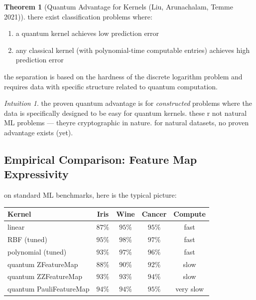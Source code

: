 \documentclass[11pt,a4paper]{article}
\theoremstyle{definition}
\newtheorem{theorem}{Theorem}[section]
\theoremstyle{remark}
\newtheorem*{intuition}{Intuition}
\begin{document}
\begin{theorem}[Quantum Advantage for Kernels (Liu, Arunachalam, Temme 2021)]
there exist classification problems where:
\begin{enumerate}[leftmargin=*]
    \item a quantum kernel achieves low prediction error
    \item any classical kernel (with polynomial-time computable entries) achieves high prediction error
\end{enumerate}
the separation is based on the hardness of the discrete logarithm problem and requires data with specific structure related to quantum computation.
\end{theorem}

\begin{intuition}
the proven quantum advantage is for \emph{constructed} problems where the data is specifically designed to be easy for quantum kernels. these r not natural ML problems --- theyre cryptographic in nature. for natural datasets, no proven advantage exists (yet).
\end{intuition}

\subsection{Empirical Comparison: Feature Map Expressivity}

on standard ML benchmarks, here is the typical picture:

\begin{center}
\renewcommand{\arraystretch}{1.4}
\begin{tabular}{|l|c|c|c|c|}
\hline
\textbf{Kernel} & \textbf{Iris} & \textbf{Wine} & \textbf{Cancer} & \textbf{Compute} \\
\hline
linear & $87\%$ & $95\%$ & $95\%$ & fast \\
\hline
RBF (tuned) & $95\%$ & $98\%$ & $97\%$ & fast \\
\hline
polynomial (tuned) & $93\%$ & $97\%$ & $96\%$ & fast \\
\hline
quantum ZFeatureMap & $88\%$ & $90\%$ & $92\%$ & slow \\
\hline
quantum ZZFeatureMap & $93\%$ & $93\%$ & $94\%$ & slow \\
\hline
quantum PauliFeatureMap & $94\%$ & $94\%$ & $95\%$ & very slow \\
\hline
\end{tabular}
\end{center}
\end{document}
